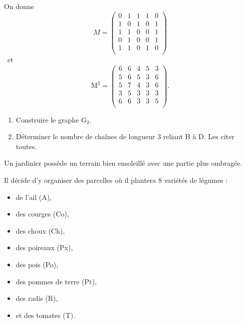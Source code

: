 \documentclass[]{prof}
\begin{document}
On donne \[
    M = 
\begin{pmatrix}
    0   &   1   &   1   &   1   &   0\\
    1   &   0   &   1   &   0   &   1\\
    1   &   1   &   0   &   0   &   1\\
    0   &   1   &   0   &   0   &   1\\
    1   &   1   &   0   &   1   &   0\\
\end{pmatrix}
\]
~et~
\[
    \text{M}^3 = 
\begin{pmatrix}
    6   &   6   &   4   &   5   &   3\\
    5   &   6   &   5   &   3   &   6\\
    5   &   7   &   4   &   3   &   6\\
    3   &   5   &   3   &   3   &   3\\
    6   &   6   &   3   &   3   &   5\\
\end{pmatrix}.
\]
\begin{enumerate}
\item Construire le graphe G$_2$.
\item Déterminer le nombre de chaînes de longueur 3 reliant B à D. Les citer toutes.
\end{enumerate}


\vfill\newpage\null 


\bigskip
Un jardinier possède un terrain bien ensoleillé avec une partie plus ombragée.

Il décide d'y organiser des parcelles où il plantera 8 variétés de légumes :

\medskip
\begin{center}\begin{minipage}[t]{0.48\textwidth}
    \begin{itemize}
    \item de l'ail (A),
    \item des courges (Co),
    \item des choux (Ch),
    \item des poireaux (Px),
    \item des pois (Po),
    \item des pommes de terre (Pt),
    \item des radis (R),
    \item et des tomates (T).
    \end{itemize}
\end{minipage}\end{center}
\end{document}
